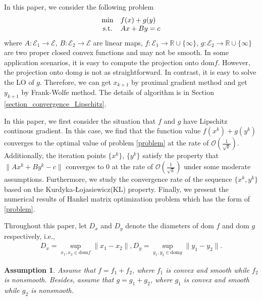 \documentclass{article}
\numberwithin{equation}{section}
\newtheorem{assumption}{Assumption}[section]
\begin{document}
In this paper, we consider the following problem
\begin{equation}
    \begin{array}{cl} \label{problem}
        \min    &f(x)+ g(y) \\
        {\rm{s.t.}} &Ax+By=c
        \end{array}
\end{equation}
where $A: \mathcal{E}_1 \rightarrow \mathcal{E}$, $B: \mathcal{E}_2 \rightarrow \mathcal{E}$ are linear maps, 
$f: \mathcal{E}_1 \rightarrow \mathbb{R}\cup\{\infty\}$, 
$g: \mathcal{E}_2 \rightarrow \mathbb{R}\cup\{\infty\}$ are two proper closed convex functions 
and may not be smooth. In some application scenarios, it is easy to compute the projection onto $\mathrm{dom} f$. However, the projection onto $\mathrm{dom} g$ is not as straightforward. In contrast, 
it is easy to solve the LO of $g$. Therefore, we can get $x_{k+1}$ by proximal gradient method and get $y_{k+1}$ by Frank-Wolfe
method.  The details of algorithm is in Section \ref{section_convergence_Lipschitz}.

In this paper, we first consider the situation that $f$ and $g$ have Lipschitz continous gradient. In this case, 
we find that the function value $f(x^k)+ g(y^k)$ converges to the optimal value of problem \eqref{problem}
at the rate of $\mathcal{O}\left( \frac{1}{\sqrt{k}} \right)$. Additionally, the iteration points $\{x^k\}$, $\{y^k\}$ 
satisfy the property that $\|Ax^k+By^k-c\rVert$  converges to 0 at the rate of $\mathcal{O}\left(\frac{1}{\sqrt{k}}\right)$ 
under some moderate assumptions. 
Furthermore, we study the convergence rate of the sequence $\{x^k,y^k\}$ based on the 
Kurdyka-\L{}ojasiewicz(KL) property. Finally, we present the numerical results of Hankel matrix optimization
problem which has the form of \eqref{problem}.  

Throughout this paper, let $D_x$ and $D_y$ denote the diameters of $\mathrm{dom}$ $f$ 
and $\mathrm{dom}$ $g$ respectively, i.e.,
\begin{align} \label{Definition_of_diameter}
    D_x = \sup\limits_{x_1,x_2\in \mathrm{dom}f}\|x_1 -x_2\rVert,
    D_y = \sup\limits_{y_1,y_2\in \mathrm{dom}g}\|y_1 -y_2\rVert.
\end{align}

\begin{assumption} \label{Assumption 1}
    Assume that $f = f_1 +f_2$, 
    where $f_1$ is convex and smooth while $f_2$ is nonsmooth.
    Besides, assume that   
    $g = g_1 +g_2$, where $g_1$ is convex and smooth while $g_2$ is nonsmooth. 
\end{assumption}
\end{document}
